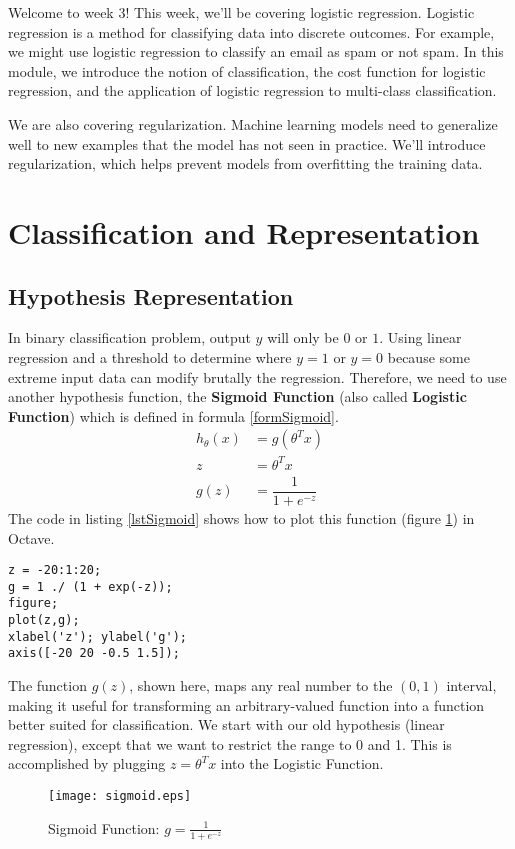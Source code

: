 Welcome to week 3! This week, we’ll be covering logistic regression. Logistic regression is a method for classifying data into discrete outcomes. For example, we might use logistic regression to classify an email as spam or not spam. In this module, we introduce the notion of classification, the cost function for logistic regression, and the application of logistic regression to multi-class classification.

We are also covering regularization. Machine learning models need to generalize well to new examples that the model has not seen in practice. We’ll introduce regularization, which helps prevent models from overfitting the training data. 

\section{Classification and Representation}
\subsection{Hypothesis Representation}
In binary classification problem, output $y$ will only be $0$ or $1$. Using linear regression and a threshold to determine where $y = 1$ or $y = 0$ because some extreme input data can modify brutally the regression. Therefore, we need to use another hypothesis function, the \textbf{Sigmoid Function} (also called \textbf{Logistic Function}) which is defined in formula \eqref{formSigmoid}.
\begin{align} \label{formSigmoid}
	h_\theta (x) 	&=  g ( \theta^T x ) \nonumber \\
	z 				&= \theta^T x \nonumber \\
	g(z) 			&= \dfrac{1}{1 + e^{-z}}
\end{align}
The code in listing \ref{lstSigmoid} shows how to plot this function (figure \ref{figSigmoid}) in Octave.
\begin{lstlisting}[label=lstSigmoid,caption=Sigmoid Function]
z = -20:1:20;
g = 1 ./ (1 + exp(-z));
figure;
plot(z,g);
xlabel('z'); ylabel('g');
axis([-20 20 -0.5 1.5]);
\end{lstlisting}
The function $g(z)$, shown here, maps any real number to the $(0, 1)$ interval, making it useful for transforming an arbitrary-valued function into a function better suited for classification. We start with our old hypothesis (linear regression), except that we want to restrict the range to 0 and 1. This is accomplished by plugging $z = \theta^Tx$ into the Logistic Function. 
\begin{figure}[!ht]
\centering
\texttt{[image: sigmoid.eps]}
\caption[Sigmoid Function]{Sigmoid Function: $g = \frac{1}{1 + e^{-z}}$}
\label{figSigmoid}
\end{figure}

